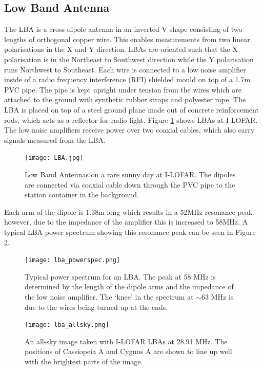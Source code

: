 \subsection{Low Band Antenna}
The LBA is a cross dipole antenna in an inverted V shape consisting of two lengths of orthogonal copper wire. This enables measurements from two linear polarisations in the X and Y direction. LBAs are oriented such that the X polarisation is in the Northeast to Southwest direction while the Y polarisation runs Northwest to Southeast. Each wire is connected to a low noise amplifier inside of a radio frequency interference (RFI) shielded mould on top of a 1.7m PVC pipe. The pipe is kept upright under tension from the wires which are attached to the ground with synthetic rubber straps and polyester rope. The LBA is placed on top of a steel ground plane made out of concrete reinforcement rods, which acts as a reflector for radio light. Figure \ref{fig:LBA} shows LBAs at I-LOFAR. The low noise amplifiers receive power over two coaxial cables, which also carry signals measured from the LBA.

\begin{figure}[ht]
\centering
\texttt{[image: LBA.jpg]}
\caption[Low Band Antennas at I-LOFAR]{Low Band Antennas on a rare sunny day at I-LOFAR. The dipoles are connected via coaxial cable down through the PVC pipe to the station container in the background.}
\label{fig:LBA}
\end{figure}

Each arm of the dipole is 1.38m long which results in a 52MHz resonance peak however, due to the impedance of the amplifier this is increased to 58MHz. A typical LBA power spectrum showing this resonance peak can be seen in Figure \ref{fig:LBA_power_spec}.

\begin{figure}[ht]
    \centering
    \texttt{[image: lba\_powerspec.png]}
    \caption[Typical power spectrum for an LBA.]{Typical power spectrum for an LBA. The peak at 58 MHz is determined by the length of the dipole arms and the impedance of the low noise amplifier. The `knee' in the spectrum at $\sim 63$ MHz is due to the wires being turned up at the ends.}
    \label{fig:LBA_power_spec}
\end{figure}

\begin{figure}[ht]
\centering
\texttt{[image: lba\_allsky.png]}
\caption[A total intensity all sky image taken with I-LOFAR LBAs.]{An all-sky image taken with I-LOFAR LBAs at 28.91 MHz. The positions of Cassiopeia A and Cygnus A are shown to line up well with the brightest parts of the image.}
\label{fig:LBA_allsky}
\end{figure}

